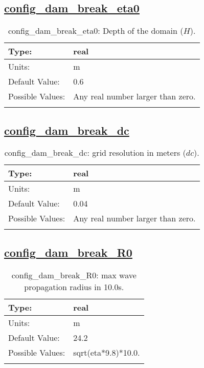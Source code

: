 \subsection[config\_dam\_break\_eta0]{\hyperref[sec:nm_tab_dam_break]{config\_dam\_break\_eta0}}
\label{subsec:nm_sec_config_dam_break_eta0}
\begin{center}
\begin{longtable}{| p{2.0in} || p{4.0in} |}
    \hline
    Type: & real \\
    \hline
    Units: & \si{m} \\
    \hline
    Default Value: & 0.6 \\
    \hline
    Possible Values: & Any real number larger than zero. \\
    \hline
    \caption{config\_dam\_break\_eta0: Depth of the domain ($H$).}
\end{longtable}
\end{center}
\subsection[config\_dam\_break\_dc]{\hyperref[sec:nm_tab_dam_break]{config\_dam\_break\_dc}}
\label{subsec:nm_sec_config_dam_break_dc}
\begin{center}
\begin{longtable}{| p{2.0in} || p{4.0in} |}
    \hline
    Type: & real \\
    \hline
    Units: & \si{m} \\
    \hline
    Default Value: & 0.04 \\
    \hline
    Possible Values: & Any real number larger than zero. \\
    \hline
    \caption{config\_dam\_break\_dc: grid resolution in meters ($dc$).}
\end{longtable}
\end{center}
\subsection[config\_dam\_break\_R0]{\hyperref[sec:nm_tab_dam_break]{config\_dam\_break\_R0}}
\label{subsec:nm_sec_config_dam_break_R0}
\begin{center}
\begin{longtable}{| p{2.0in} || p{4.0in} |}
    \hline
    Type: & real \\
    \hline
    Units: & \si{m} \\
    \hline
    Default Value: & 24.2 \\
    \hline
    Possible Values: & sqrt(eta*9.8)*10.0. \\
    \hline
    \caption{config\_dam\_break\_R0: max wave propagation radius in 10.0s.}
\end{longtable}
\end{center}
